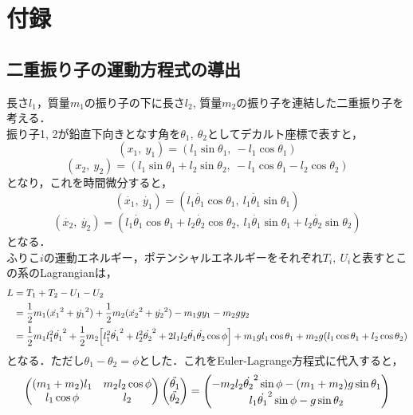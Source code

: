 \documentclass[a4paper,11pt]{jsarticle}
\begin{document}
\section{付録}
\subsection{二重振り子の運動方程式の導出} \label{ch:EL-eq}
長さ\(l_1\)，質量\(m_1\)の振り子の下に長さ\(l_2\), 質量\(m_2\)の振り子を連結した二重振り子を考える．\\
振り子1, 2が鉛直下向きとなす角を\(\theta_1,\ \theta_2\)としてデカルト座標で表すと，
\begin{equation}
  (x_1,\ y_1) = (l_1\sin{\theta_1},\ -l_1\cos{\theta_1})
\end{equation}
\begin{equation}
  (x_2,\ y_2) = (l_1\sin{\theta_1} + l_2\sin{\theta_2},\ -l_1\cos{\theta_1}-l_2\cos{\theta_2})
\end{equation}
となり，これを時間微分すると，
\begin{equation}
  (\dot{x_1},\ \dot{y_1}) = (l_1\dot{\theta_1}\cos{\theta_1},\ l_1\dot{\theta_1}\sin{\theta_1})
\end{equation}
\begin{equation}
  (\dot{x_2},\ \dot{y_2}) = (l_1\dot{\theta_1}\cos{\theta_1} + l_2\dot{\theta_2}\cos{\theta_2},\ l_1\dot{\theta_1}\sin{\theta_1}+l_2\dot{\theta_2}\sin{\theta_2})
\end{equation}
となる．\\
ふりこ\(i\)の運動エネルギー，ポテンシャルエネルギーをそれぞれ\(T_i,\ U_i\)と表すとこの系のLagrangianは，
\begin{gather}
  \begin{split}
    L &= T_1 + T_2 - U_1 -U_2 \\
      &= \dfrac{1}{2}m_1(\dot{x_1}^2+\dot{y_1}^2) + \dfrac{1}{2}m_2(\dot{x_2}^2+\dot{y_2}^2) -m_1gy_1 -m_2gy_2 \\
      &= \dfrac{1}{2}m_1l_1^2\dot{\theta_1}^2 + \dfrac{1}{2}m_2\qty[l_1^2\dot{\theta_1}^2+l_2^2\dot{\theta_2}^2+2l_1l_2\dot{\theta_1}\dot{\theta_2}\cos\phi]+m_1gl_1\cos{\theta_1}+m_2g(l_1\cos{\theta_1+l_2\cos{\theta_2}})
  \end{split}
\end{gather}
となる．ただし\(\theta_1-\theta_2 = \phi\)とした．これをEuler-Lagrange方程式に代入すると，
\begin{equation}
  \begin{pmatrix}
    (m_1+m_2)l_1 & m_2l_2\cos{\phi} \\
    l_1\cos{\phi} & l_2 \\
  \end{pmatrix}
  \mqty(\ddot{\theta_1} \\ \ddot{\theta_2})
  =
  \mqty(-m_2l_2\dot{\theta_2}^2\sin{\phi}-(m_1+m_2)g\sin{\theta_1} \\ l_1\dot{\theta_1}^2\sin{\phi}-g\sin{\theta_2})
\end{equation}
\end{document}

